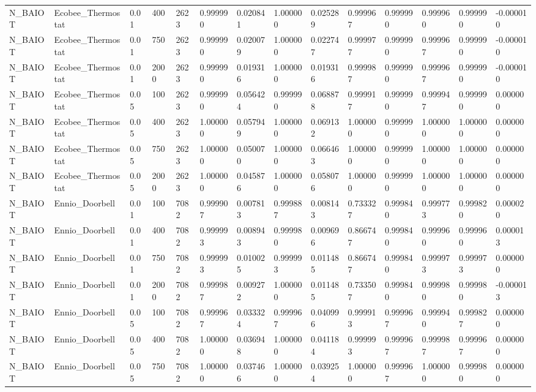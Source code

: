\begin{tabular}{llllllllllllll}
N\_BAIOT & Ecobee\_Thermostat & 0.01 & 400 & 2623 & 0.999990 & 0.020841 & 1.000000 & 0.025289 & 0.999967 & 0.999990 & 0.999960 & 0.999990 & -0.000010 \\
N\_BAIOT & Ecobee\_Thermostat & 0.01 & 750 & 2623 & 0.999990 & 0.020079 & 1.000000 & 0.022747 & 0.999977 & 0.999990 & 0.999967 & 0.999990 & -0.000010 \\
N\_BAIOT & Ecobee\_Thermostat & 0.01 & 2000 & 2623 & 0.999990 & 0.019316 & 1.000000 & 0.019316 & 0.999987 & 0.999990 & 0.999967 & 0.999990 & -0.000010 \\
N\_BAIOT & Ecobee\_Thermostat & 0.05 & 100 & 2623 & 0.999990 & 0.056424 & 0.999990 & 0.068878 & 0.999917 & 0.999990 & 0.999947 & 0.999990 & 0.000000 \\
N\_BAIOT & Ecobee\_Thermostat & 0.05 & 400 & 2623 & 1.000000 & 0.057949 & 1.000000 & 0.069132 & 1.000000 & 0.999990 & 1.000000 & 1.000000 & 0.000000 \\
N\_BAIOT & Ecobee\_Thermostat & 0.05 & 750 & 2623 & 1.000000 & 0.050070 & 1.000000 & 0.066463 & 1.000000 & 0.999990 & 1.000000 & 1.000000 & 0.000000 \\
N\_BAIOT & Ecobee\_Thermostat & 0.05 & 2000 & 2623 & 1.000000 & 0.045876 & 1.000000 & 0.058076 & 1.000000 & 0.999990 & 1.000000 & 1.000000 & 0.000000 \\
N\_BAIOT & Ennio\_Doorbell & 0.01 & 100 & 7082 & 0.999907 & 0.007813 & 0.999887 & 0.008143 & 0.733327 & 0.999840 & 0.999773 & 0.999820 & 0.000020 \\
N\_BAIOT & Ennio\_Doorbell & 0.01 & 400 & 7082 & 0.999993 & 0.008943 & 0.999980 & 0.009696 & 0.866747 & 0.999840 & 0.999960 & 0.999960 & 0.000013 \\
N\_BAIOT & Ennio\_Doorbell & 0.01 & 750 & 7082 & 0.999993 & 0.010025 & 0.999993 & 0.011485 & 0.866747 & 0.999840 & 0.999973 & 0.999973 & 0.000000 \\
N\_BAIOT & Ennio\_Doorbell & 0.01 & 2000 & 7082 & 0.999987 & 0.009272 & 1.000000 & 0.011485 & 0.733507 & 0.999840 & 0.999980 & 0.999980 & -0.000013 \\
N\_BAIOT & Ennio\_Doorbell & 0.05 & 100 & 7082 & 0.999967 & 0.033324 & 0.999967 & 0.040996 & 0.999913 & 0.999967 & 0.999940 & 0.999827 & 0.000000 \\
N\_BAIOT & Ennio\_Doorbell & 0.05 & 400 & 7082 & 1.000000 & 0.036948 & 1.000000 & 0.041184 & 0.999993 & 0.999967 & 0.999987 & 0.999967 & 0.000000 \\
N\_BAIOT & Ennio\_Doorbell & 0.05 & 750 & 7082 & 1.000000 & 0.037466 & 1.000000 & 0.039254 & 1.000000 & 0.999967 & 1.000000 & 0.999980 & 0.000000 \\

\end{tabular}

